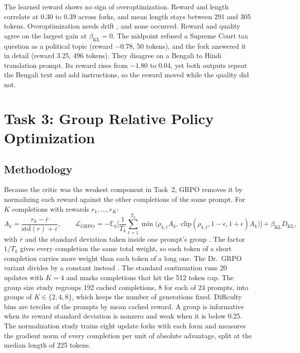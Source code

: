 \documentclass{article}
\begin{document}
The learned reward shows no sign of overoptimization. Reward and length
correlate at 0.30 to 0.39 across forks, and mean length stays between 291 and
305 tokens. Overoptimization needs drift \citep{gao2023scaling}, and none
occurred. Reward and quality agree on the largest gain at $\beta_{\text{KL}}=0$.
The midpoint refused a Supreme Court tax question as a political topic (reward
$-0.78$, 50 tokens), and the fork answered it in detail (reward 3.25, 496
tokens). They disagree on a Bengali to Hindi translation prompt. Its reward
rises from $-1.80$ to 0.04, yet both outputs repeat the Bengali text and add
instructions, so the reward moved while the quality did not.

\section{Task 3: Group Relative Policy Optimization}
\label{sec:task3}

\subsection{Methodology}

Because the critic was the weakest component in Task~2, GRPO removes it by
normalizing each reward against the other completions of the same prompt. For $K$ completions with rewards
$r_1,\dots,r_K$:
\begin{equation}
  A_k=\frac{r_k-\bar r}{\mathrm{std}(r)+\varepsilon},\qquad
  \mathcal{L}_{\text{GRPO}}=-\mathbb{E}_k\Big[\frac{1}{T_k}\sum_{t=1}^{T_k}\min\big(\rho_{k,t}A_k,\ \mathrm{clip}(\rho_{k,t},1-\epsilon,1+\epsilon)A_k\big)\Big]+\beta_{\text{KL}}D_{\text{KL}},
  \label{eq:grpo}
\end{equation}
with $\bar r$ and the standard deviation taken inside one prompt's group
\citep{shao2024deepseekmath}. The factor $1/T_k$ gives every completion the
same total weight, so each token of a short completion carries more weight than
each token of a long one. The Dr.\ GRPO variant divides by a constant instead
\citep{liu2025understanding}. The standard continuation runs 20 updates with
$K=4$ and masks completions that hit the 512 token cap. The group size study
regroups 192 cached completions, 8 for each of 24 prompts, into groups of
$K\in\{2,4,8\}$, which keeps the number of generations fixed. Difficulty bins
are terciles of the prompts by mean cached reward. A group is informative when
its reward standard deviation is nonzero and weak when it is below 0.25. The
normalization study trains eight update forks with each form and measures the
gradient norm of every completion per unit of absolute advantage, split at the
median length of 225 tokens.
\end{document}
